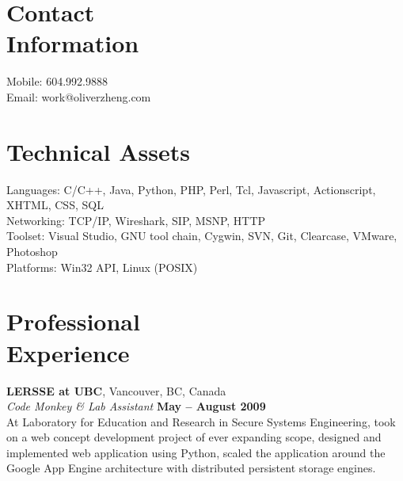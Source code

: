 \documentclass[margin,line]{resume}
\begin{document}
\begin{resume}

    \section{\mysidestyle Contact\\Information}

    Mobile: 604.992.9888
        \vspace{0mm}\\\vspace{0mm}%
    Email: work@oliverzheng.com

    \section{\mysidestyle Technical Assets}
    Languages: C/C++, Java, Python, PHP, Perl, Tcl, Javascript, Actionscript, XHTML, CSS, SQL
        \vspace{1mm}\\
    Networking: TCP/IP, Wireshark, SIP, MSNP, HTTP
        \vspace{1mm}\\
    Toolset: Visual Studio, GNU tool chain, Cygwin, SVN, Git, Clearcase, VMware, Photoshop
        \vspace{1mm}\\
    Platforms: Win32 API, Linux (POSIX)

    \section{\mysidestyle Professional\\Experience}

    \textbf{LERSSE at UBC}, Vancouver, BC, Canada \vspace{2mm}\\\vspace{1mm}%
    \textsl{Code Monkey \& Lab Assistant} \hfill \textbf{May -- August 2009}\\
    At Laboratory for Education and Research in Secure Systems Engineering,
    took on a web concept development project of ever expanding scope,
    designed and implemented web application using Python,
    scaled the application around the Google App Engine architecture with distributed persistent storage engines.


\end{resume}
\end{document}
